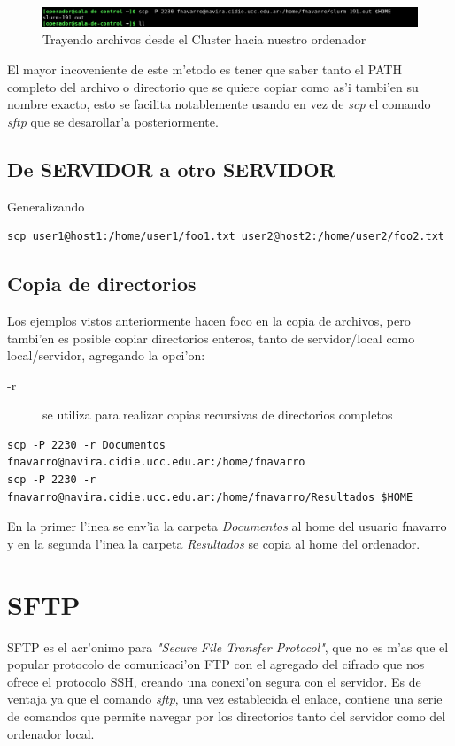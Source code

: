\documentclass[a4paper]{scrartcl}
\newcommand{\BashFancyFormatLine}{%
  \def\FancyVerbFormatLine##1{\$\,##1}%
}
\begin{document}
\begin{figure}[!ht]
	\includegraphics[width=\columnwidth]{./ssh_scp_sftp_imgs/StoL}
	\caption{Trayendo archivos desde el Cluster hacia nuestro ordenador}
	\label{fig:StoL}
\end{figure}

El mayor incoveniente de este m'etodo es tener que saber tanto el PATH completo del archivo o directorio que se quiere copiar como as'i tambi'en su nombre exacto, esto se facilita notablemente usando en vez de \textit{scp} el comando \textit{sftp} que se desarollar'a posteriormente.

\subsection{De SERVIDOR a otro SERVIDOR}
Generalizando
\begin{verbatim}
scp user1@host1:/home/user1/foo1.txt user2@host2:/home/user2/foo2.txt 
\end{verbatim}

\subsection{Copia de directorios}
Los ejemplos vistos anteriormente hacen foco en la copia de archivos, pero tambi'en es posible copiar directorios enteros, tanto de servidor/local como local/servidor, agregando la opci'on:
\begin{description}
	\item[-r] se utiliza para realizar copias recursivas de directorios completos
\end{description}

\begin{verbatim}
scp -P 2230 -r Documentos fnavarro@navira.cidie.ucc.edu.ar:/home/fnavarro
scp -P 2230 -r fnavarro@navira.cidie.ucc.edu.ar:/home/fnavarro/Resultados $HOME
\end{verbatim}

En la primer l'inea se env'ia la carpeta \textit{Documentos} al home del usuario fnavarro y en la segunda l'inea la carpeta \textit{Resultados} se copia al home del ordenador.


\section{SFTP}
SFTP es el acr'onimo para \textit{"Secure File Transfer Protocol"}, que no es m'as que el popular protocolo de comunicaci'on FTP con el agregado del cifrado que nos ofrece el protocolo SSH, creando una conexi'on segura con el servidor. Es de ventaja ya que el comando \textit{sftp}, una vez establecida el enlace, contiene una serie de comandos que permite navegar por los directorios tanto del servidor como del ordenador local.
\end{document}
